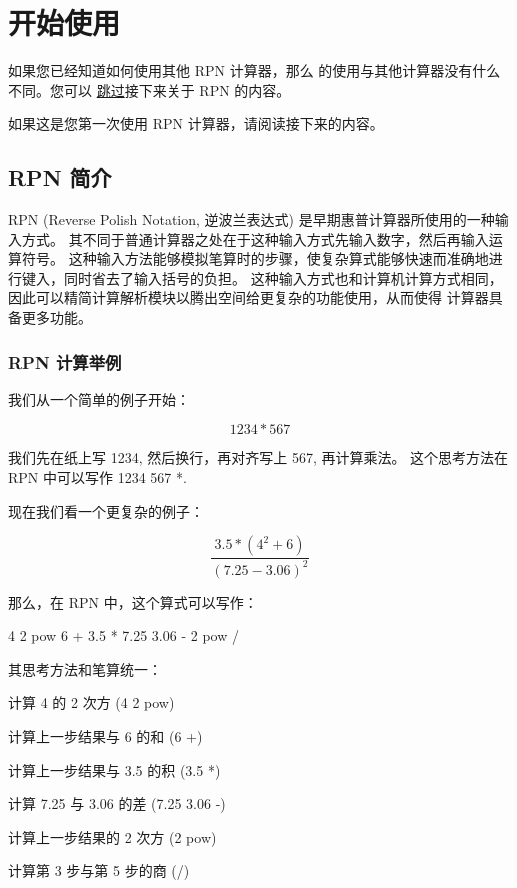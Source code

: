 
\chapter{开始使用}

如果您已经知道如何使用其他 RPN 计算器，那么 \wpx 的使用与其他计算器没有什么不同。您可以
\hyperref[section:basic_ops]{跳过}接下来关于 RPN 的内容。

如果这是您第一次使用 RPN 计算器，请阅读接下来的内容。

\section{RPN 简介}

RPN (Reverse Polish Notation, 逆波兰表达式) 是早期惠普计算器所使用的一种输入方式。
其不同于普通计算器之处在于这种输入方式先输入数字，然后再输入运算符号。
这种输入方法能够模拟笔算时的步骤，使复杂算式能够快速而准确地进行键入，同时省去了输入括号的负担。
这种输入方式也和计算机计算方式相同，因此可以精简计算解析模块以腾出空间给更复杂的功能使用，从而使得
计算器具备更多功能。

\subsection{RPN 计算举例}

我们从一个简单的例子开始：

$$ 1234 * 567 $$

我们先在纸上写 1234, 然后换行，再对齐写上 567, 再计算乘法。
这个思考方法在 RPN 中可以写作 1234 567 *.

现在我们看一个更复杂的例子：

$$ \frac{3.5 * (4^2 + 6)}{(7.25 - 3.06)^2} $$

那么，在 RPN 中，这个算式可以写作：

4 2 pow 6 + 3.5 * 7.25 3.06 - 2 pow /

其思考方法和笔算统一：

\ol
\item 计算 4 的 2 次方 (4 2 pow)
\item 计算上一步结果与 6 的和 (6 +)
\item 计算上一步结果与 3.5 的积 (3.5 *)
\item 计算 7.25 与 3.06 的差 (7.25 3.06 -)
\item 计算上一步结果的 2 次方 (2 pow)
\item 计算第 3 步与第 5 步的商 (/)
\olx

